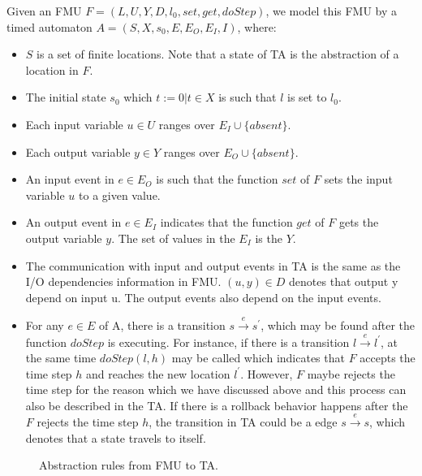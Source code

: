 Given an FMU $F=(L,U,Y,D,l_{0},set,get,doStep)$, we model this FMU by a timed automaton $A = (S,X,s_{0},E,E_{O},E_{I},I)$, where:
\begin{itemize}
\item
$S$ is a set of finite locations. Note that a state of TA is the abstraction of a location in $F$.
\item
The initial state $s_{0}$ which $t:=0 \vert t \in X$ is such that $l$ is set to $l_{0}$. 
\item
Each input variable $u \in U$ ranges over $E_{I} \cup \{absent\}$.
\item
Each output variable $y \in Y$ ranges over $E_{O} \cup \{absent\}$.
\item
An input event in $e \in E_{O}$ is such that the function $set$ of $F$ sets the input variable $u$ to a given value. 
\item
An output event in $e \in E_{I}$ indicates that the function $get$ of $F$ gets the output variable $y$. The set of values in the $E_{I}$ is the $Y$.  
\item
The communication with input and output events in TA is the same as the I/O dependencies information in FMU. $(u,y) \in D$ denotes that output y depend on input u. The output events also depend on the input events.
\item
For any $e \in E$ of A, there is a transition $s \xrightarrow{e} s^{\prime}$, which may be found after the function $doStep$ is executing. For instance, if there is a transition $l \xrightarrow{e} l^{\prime}$, at the same time $doStep(l,h)$ may be called which indicates that $F$ accepts the time step $h$ and reaches the new location $l^{\prime}$. However, $F$ maybe rejects the time step for the reason which we have discussed above and this process can also be described in the TA. If there is a rollback behavior happens after the $F$ rejects the time step $h$, the transition in TA could be a edge $s \xrightarrow{e} s$, which denotes that a state travels to itself.

\end{itemize}
\begin{figure}[htbp]
	\begin{center}
	\caption{Abstraction rules from FMU to TA.}
	\end{center}\label{paperarc}
\end{figure}
